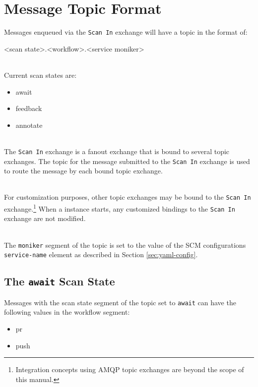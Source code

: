 \section{Message Topic Format}

Messages enqueued via the \texttt{Scan In} exchange will have a topic in the format of:

\begin{code}{}{}{}
<scan state>.<workflow>.<service moniker>
\end{code}

\noindent\\Current scan states are:

\begin{itemize}
    \item await
    \item feedback
    \item annotate
\end{itemize}

\noindent\\The \texttt{Scan In} exchange is a fanout exchange that is bound to several topic
exchanges.  The topic for the message submitted to the \texttt{Scan In} exchange is used to
route the message by each bound topic exchange.

\noindent\\For customization purposes, other topic
exchanges may be bound to the \texttt{Scan In} exchange.\footnote{Integration concepts
using AMQP topic exchanges are beyond the scope of this manual.} When a \cxoneflow instance starts,
any customized bindings to the \texttt{Scan In} exchange are not modified.


\noindent\\The \texttt{moniker} segment of the topic is set to the value of the
SCM configurations \texttt{service-name} element as described in
Section \ref{sec:yaml-config}.

\subsection{The \texttt{await} Scan State}

Messages with the scan state segment of the topic set to \texttt{await} can have the following
values in the workflow segment:

\begin{itemize}
    \item pr
    \item push
\end{itemize}

